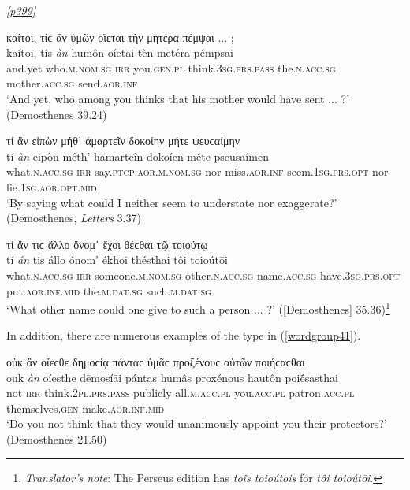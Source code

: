 \hyperlink{p399}{\emph{[p399]}}

\begin{exe}
\ex καίτοι, τίϲ ἂν ὑμῶν οἴεται τὴν μητέρα πέμψαι ... ;\\
\gll kaítoi, tís \emph{àn} humôn oíetai tḕn mētéra pémpsai\\
and.yet who.\textsc{m.nom.sg} \textsc{irr} you.\textsc{gen.pl} think.\textsc{3sg.prs.pass} the.\textsc{n.acc.sg} mother.\textsc{acc.sg} send.\textsc{aor.inf}\\
\trans `And yet, who among you thinks that his mother would have sent ... ?' (Demosthenes 39.24)
\label{wordgroup38}
\end{exe}

\begin{exe}
\ex τί ἂν εἰπὼν μήθ᾽ ἁμαρτεῖν δοκοίην μήτε ψευϲαίμην\\
\gll tí \emph{àn} eipṑn mḗth' hamarteîn dokoíēn mḗte pseusaímēn\\
what.\textsc{n.acc.sg} \textsc{irr} say.\textsc{ptcp.aor.m.nom.sg} nor miss.\textsc{aor.inf} seem.\textsc{1sg.prs.opt} nor lie.\textsc{1sg.aor.opt.mid}\\
\trans `By saying what could I neither seem to understate nor exaggerate?' (Demosthenes, \textit{Letters} 3.37)
\label{wordgroup39}
\end{exe}

\begin{exe}
\ex τί ἄν τιϲ ἄλλο ὄνομ᾽ ἔχοι θέϲθαι τῷ τοιούτῳ\\
\gll tí \emph{án} tis állo ónom' ékhoi thésthai tôi toioútōi\\
what.\textsc{n.acc.sg} \textsc{irr} someone.\textsc{m.nom.sg} other.\textsc{n.acc.sg} name.\textsc{acc.sg} have.\textsc{3sg.prs.opt} put.\textsc{aor.inf.mid} the.\textsc{m.dat.sg} such.\textsc{m.dat.sg}\\
\trans `What other name could one give to such a person ... ?' ({[}Demosthenes{]} 35.36)\footnote{\emph{Translator's note}: The Perseus edition has \textit{toîs toioútois} for \textit{tôi toioútōi}.}
\label{wordgroup40}
\end{exe}

In addition, there are numerous examples of the type in (\ref{wordgroup41}).

\begin{exe}
\ex οὐκ ἂν οἴεϲθε δημοϲίᾳ πάνταϲ ὑμᾶϲ προξένουϲ αὑτῶν ποιήϲαϲθαι\\
\gll ouk \emph{àn} oíesthe dēmosíāi pántas humâs proxénous hautôn poiḗsasthai\\
not \textsc{irr} think.\textsc{2pl.prs.pass} publicly all.\textsc{m.acc.pl} you.\textsc{acc.pl} patron.\textsc{acc.pl} themselves.\textsc{gen} make.\textsc{aor.inf.mid}\\
\trans `Do you not think that they would unanimously appoint you their protectors?' (Demosthenes 21.50)
\label{wordgroup41}
\end{exe}


